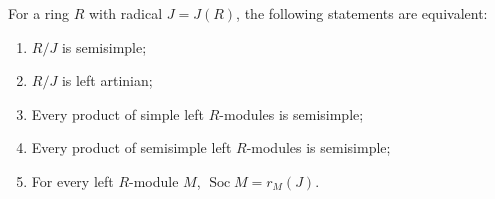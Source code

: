 For a ring $R$ with radical $J = J(R)$, the following statements are equivalent:
\begin{enumerate}
\item[(a)] $R/J$ is semisimple;
\item[(b)] $R/J$ is left artinian;
\item[(c)] Every product of simple left $R$-modules is semisimple;
\item[(d)] Every product of semisimple left $R$-modules is semisimple;
\item[(e)] For every left $R$-module $M$, $\operatorname{Soc} M = r_M(J)$.
\end{enumerate}
